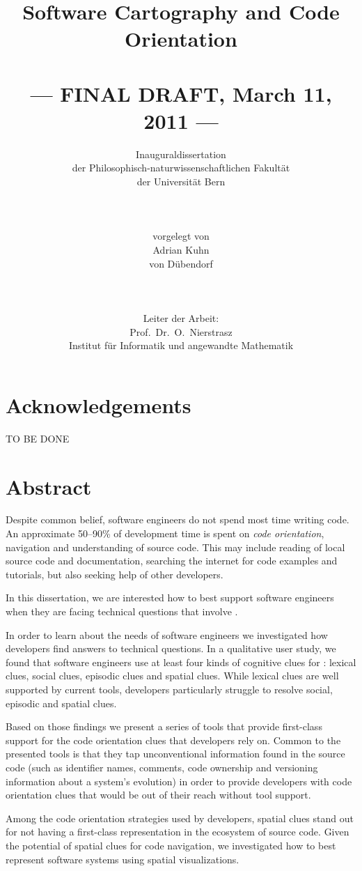 \documentclass[10pt]{book}
\title{Software Cartography and Code Orientation\\~\\--- FINAL DRAFT, March 11, 2011 ---}
\author{Inauguraldissertation\\
der Philosophisch-naturwissenschaftlichen Fakult\"at\\
der Universit\"at Bern\\
\\
\\
\\
vorgelegt von\\
Adrian Kuhn\\
von D\"ubendorf\\ 
\\
\\
\\
Leiter der Arbeit:\\
Prof.\ Dr.\ O.\ Nierstrasz\\ 
Institut f\"ur Informatik und angewandte Mathematik}
\date{}
\begin{document}
\maketitle

\chapter*{Acknowledgements}
TO BE DONE

\chapter*{Abstract}

Despite common belief, software engineers do not spend most time writing code. An approximate 50--90\% of development time is spent on \emph{code orientation}, \ie navigation and understanding of source code. This may include reading of local source code and documentation, searching the internet for code examples and tutorials, but also seeking help of other developers. 

In this dissertation, we are interested how to best support software engineers when they are facing technical questions that involve \codenavigation. 

In order to learn about the \codenavigation needs of software engineers we investigated how developers find answers to technical questions. In a qualitative user study, we found that software engineers use at least four kinds of cognitive clues for \codenavigation: 
	lexical clues, 
	social clues, 
	episodic clues 
	and spatial clues.
While lexical clues are well supported by current tools, developers particularly struggle to resolve social, episodic and spatial clues. 

Based on those findings we present a series of tools that provide first-class support for the code orientation clues that developers rely on. Common to the presented tools is that they tap unconventional information found in the source code (such as identifier names, comments, code ownership and versioning information about a system's evolution) in order to provide developers with code orientation clues that would be out of their reach without tool support.

Among the code orientation strategies used by developers, spatial clues stand out for not having a first-class representation in the ecosystem of source code. Given the potential of spatial clues for code navigation, we investigated how to best represent software systems using spatial visualizations. 
\end{document}
